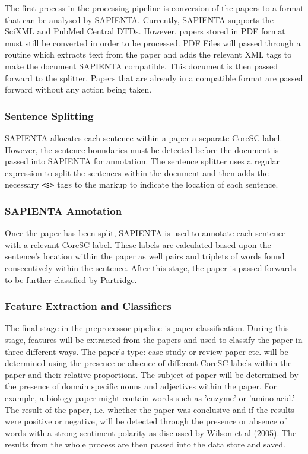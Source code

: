 The first process in the processing pipeline is conversion of the papers to a
format that can be analysed by SAPIENTA. Currently, SAPIENTA supports the
SciXML\cite{rupp2006flexible} and PubMed Central\cite{pubmedDTD} DTDs. However,
papers stored in PDF format must still be converted in order to be processed.
PDF Files will passed through a routine which extracts text from the paper and
adds the relevant XML tags to make the document SAPIENTA compatible. This
document is then passed forward to the splitter. Papers that are already in a
compatible format are passed forward without any action being taken.

\subsubsection{Sentence Splitting} 

SAPIENTA allocates each sentence within a paper a separate CoreSC label.
However, the sentence boundaries must be detected before the document is passed
into SAPIENTA for annotation. The sentence splitter uses a regular expression
to split the sentences within the document and then adds the necessary
\verb|<s>| tags to the markup to indicate the location of each sentence.

\subsubsection{SAPIENTA Annotation}

Once the paper has been split, SAPIENTA is used to annotate each sentence with
a relevant CoreSC label. These labels are calculated based upon the
sentence's location within the paper as well pairs and triplets of words found
consecutively within the sentence. After this stage, the paper is passed
forwards to be further classified by Partridge.

\subsubsection{Feature Extraction and Classifiers}

The final stage in the preprocessor pipeline is paper classification. During
this stage, features will be extracted from the papers and used to classify the
paper in three different ways. The paper's type: case study or review paper
etc. will be determined using the presence or absence of different CoreSC labels
within the paper and their relative proportions. The subject of paper will be
determined by the presence of domain specific nouns and adjectives within the
paper. For example, a biology paper might contain words such as 'enzyme' or 'amino
acid.' The result of the paper, i.e. whether the paper was conclusive and if the
results were positive or negative, will be detected through the presence or absence
of words with a strong sentiment polarity as discussed by Wilson et al
(2005)\cite{Wilson05Polarity}. The results from the whole process are then
passed into the data store and saved.

